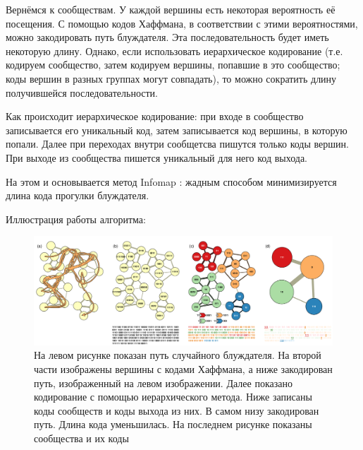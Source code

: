 \documentclass[12pt]{article}
\begin{document}
Вернёмся к сообществам. У каждой вершины есть некоторая вероятность её посещения. С помощью кодов Хаффмана, в соответствии с этими вероятностями, можно закодировать путь блуждателя. Эта последовательность будет иметь некоторую длину. Однако, если использовать иерархическое кодирование (т.е. кодируем сообщество, затем кодируем вершины, попавшие в это сообщество; коды вершин в разных группах могут совпадать), то можно сократить длину получившейся последовательности.

Как происходит иерархическое кодирование: при входе в сообщество записывается его уникальный код, затем записывается код вершины, в которую попали. Далее при переходах внутри сообщетсва пишутся только коды вершин. При выходе из сообщества пишется уникальный для него код выхода.

На этом и основывается метод Infomap \cite{infomap}: жадным способом минимизируется длина кода прогулки блуждателя.

Иллюстрация работы алгоритма:

\begin{figure}[h]
	\begin{center}
		\includegraphics[scale=0.28]{pics/infomap}
	\end{center}
	\caption{На левом рисунке показан путь случайного блуждателя. На второй части изображены вершины с кодами Хаффмана, а ниже закодирован путь, изображенный на левом изображении. Далее показано кодирование с помощью иерархического метода. Ниже записаны коды сообществ и коды выхода из них. В самом низу закодирован путь. Длина кода уменьшилась. На последнем рисунке показаны сообщества и их коды}
\end{figure}

\end{document}
